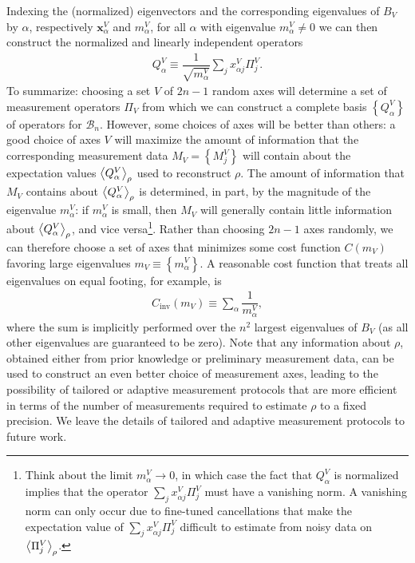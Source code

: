 \documentclass[nofootinbib,notitlepage,11pt]{revtex4-2}
\renewcommand{\t}{\text} %
\newcommand{\f}[2]{\dfrac{#1}{#2}} %
\newcommand{\p}[1]{\left(#1\right)} %
\renewcommand{\set}[1]{\left\{#1\right\}} %
\newcommand{\bk}{\Braket} %
\renewcommand{\v}{\bm} %
\newcommand{\1}{\mathds{1}}
\newcommand{\B}{\mathcal{B}}
\begin{document}
Indexing the (normalized) eigenvectors and the corresponding eigenvalues of $B_V$ by $\alpha$, respectively $\v x^V_\alpha$ and $m^V_\alpha$, for all $\alpha$ with eigenvalue $m^V_\alpha\ne0$ we can then construct the normalized and linearly independent operators
\begin{align}
  Q^V_\alpha \equiv \f1{\sqrt{m^V_\alpha}} \sum_j x^V_{\alpha j} \Pi^V_j.
\end{align}
To summarize: choosing a set $V$ of $2n-1$ random axes will determine a set of measurement operators $\Pi_V$ from which we can construct a complete basis $\set{Q^V_\alpha}$ of operators for $\B_n$.
However, some choices of axes will be better than others: a good choice of axes $V$ will maximize the amount of information that the corresponding measurement data $M_V=\set{M^V_j}$ will contain about the expectation values $\bk{Q^V_\alpha}_\rho$ used to reconstruct $\rho$.
The amount of information that $M_V$ contains about $\bk{Q^V_\alpha}_\rho$ is determined, in part, by the magnitude of the eigenvalue $m^V_\alpha$: if $m^V_\alpha$ is small, then $M_V$ will generally contain little information about $\bk{Q^V_\alpha}_\rho$, and vice versa\footnote{Think about the limit $m^V_\alpha\to0$, in which case the fact that $Q^V_\alpha$ is normalized implies that the operator $\sum_j x^V_{\alpha j} \Pi^V_j$ must have a vanishing norm.
  A vanishing norm can only occur due to fine-tuned cancellations that make the expectation value of $\sum_j x^V_{\alpha j} \Pi^V_j$ difficult to estimate from noisy data on $\bk{\Pi^V_j}_\rho$.}.
Rather than choosing $2n-1$ axes randomly, we can therefore choose a set of axes that minimizes some cost function $C\p{m_V}$ favoring large eigenvalues $m_V\equiv\set{m^V_\alpha}$.
A reasonable cost function that treats all eigenvalues on equal footing, for example, is
\begin{align}
  C_{\t{inv}}\p{m_V} \equiv \sum_\alpha \f1{m^V_\alpha},
\end{align}
where the sum is implicitly performed over the $n^2$ largest eigenvalues of $B_V$ (as all other eigenvalues are guaranteed to be zero).
Note that any information about $\rho$, obtained either from prior knowledge or preliminary measurement data, can be used to construct an even better choice of measurement axes, leading to the possibility of tailored or adaptive measurement protocols \cite{pereira2018adaptive} that are more efficient in terms of the number of measurements required to estimate $\rho$ to a fixed precision.
We leave the details of tailored and adaptive measurement protocols to future work.
\end{document}
